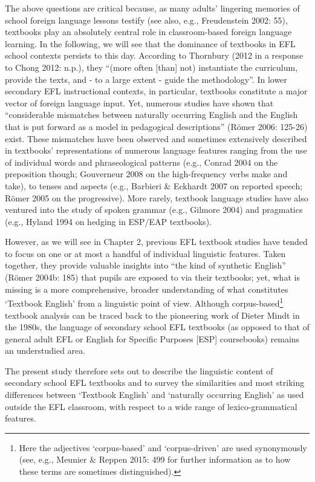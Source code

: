 \documentclass[
  letterpaper,
  DIV=11,
  numbers=noendperiod]{scrreprt}
\begin{document}
The above questions are critical because, as many adults' lingering
memories of school foreign language lessons testify (see also, e.g.,
Freudenstein 2002: 55), textbooks play an absolutely central role in
classroom-based foreign language learning. In the following, we will see
that the dominance of textbooks in EFL school contexts persists to this
day. According to Thornbury (2012 in a response to Chong 2012: n.p.),
they ``(more often {[}than{]} not) instantiate the curriculum, provide
the texts, and - to a large extent - guide the methodology''. In lower
secondary EFL instructional contexts, in particular, textbooks
constitute a major vector of foreign language input. Yet, numerous
studies have shown that ``considerable mismatches between naturally
occurring English and the English that is put forward as a model in
pedagogical descriptions'' (Römer 2006: 125-26) exist. These mismatches
have been observed and sometimes extensively described in textbooks'
representations of numerous language features ranging from the use of
individual words and phraseological patterns (e.g., Conrad 2004 on the
preposition though; Gouverneur 2008 on the high-frequency verbs make and
take), to tenses and aspects (e.g., Barbieri \& Eckhardt 2007 on
reported speech; Römer 2005 on the progressive). More rarely, textbook
language studies have also ventured into the study of spoken grammar
(e.g., Gilmore 2004) and pragmatics (e.g., Hyland 1994 on hedging in
ESP/EAP textbooks).

However, as we will see in Chapter 2, previous EFL textbook studies have
tended to focus on one or at most a handful of individual linguistic
features. Taken together, they provide valuable insights into ``the kind
of synthetic English'' (Römer 2004b: 185) that pupils are exposed to via
their textbooks; yet, what is missing is a more comprehensive, broader
understanding of what constitutes `Textbook English' from a linguistic
point of view. Although corpus-based\footnote{Here the adjectives
  `corpus-based' and `corpus-driven' are used synonymously (see, e.g.,
  Meunier \& Reppen 2015: 499 for further information as to how these
  terms are sometimes distinguished).} textbook analysis can be traced
back to the pioneering work of Dieter Mindt in the 1980s, the language
of secondary school EFL textbooks (as opposed to that of general adult
EFL or English for Specific Purposes {[}ESP{]} coursebooks) remains an
understudied area.

The present study therefore sets out to describe the linguistic content
of secondary school EFL textbooks and to survey the similarities and
most striking differences between `Textbook English' and `naturally
occurring English' as used outside the EFL classroom, with respect to a
wide range of lexico-grammatical features.
\end{document}
